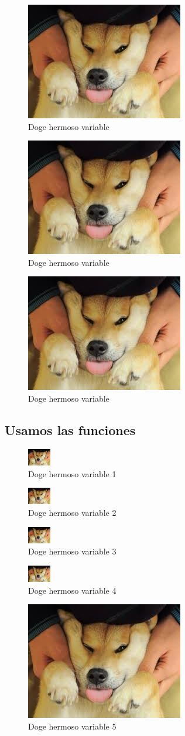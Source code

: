 \documentclass[]{article}
\newcommand{\insertadoge}[2]{
	\begin{figure}[H]
		\centering
		\includegraphics[width=#1]{doge.jpg}
		\caption{Doge hermoso variable #2}
	\end{figure}
}
\begin{document}
\begin{figure}[H]
	\centering
	\includegraphics[width=\dogesize]{doge.jpg}
	\caption{Doge hermoso variable}
\end{figure}

\begin{figure}[H]
	\centering
	\includegraphics[width=\dogesize]{doge.jpg}
	\caption{Doge hermoso variable}
\end{figure}

\begin{figure}[H]
	\centering
	\includegraphics[width=\dogesize]{doge.jpg}
	\caption{Doge hermoso variable}
\end{figure}

\subsection{Usamos las funciones}

\def\dogechico {1cm}
\insertadoge{\dogechico}{1}
\insertadoge{\dogechico}{2}
\insertadoge{\dogechico}{3}
\insertadoge{\dogechico}{4}
\insertadoge{\dogesize}{5}
\end{document}
